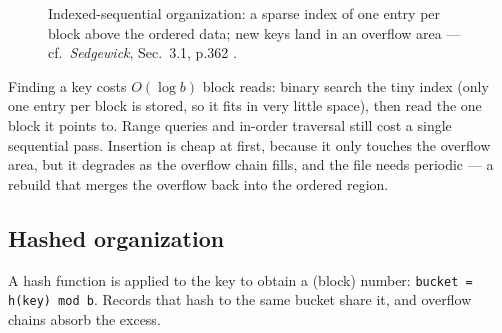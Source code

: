 \documentclass[11pt]{article}
\begin{document}
\begin{figure}[h]
  \centering
  \caption{Indexed-sequential organization: a sparse index of one entry per block above the ordered data; new keys land in an overflow area --- cf.\ \textit{Sedgewick}, Sec.~3.1, p.362 \cite{Sedgewick2011_algorithms}.}
\end{figure}

Finding a key costs $O(\log b)$ block reads: binary search the tiny index (only one entry per block is stored, so it fits in very little space), then read the one block it points to. Range queries and in-order traversal still cost a single sequential pass. Insertion is cheap at first, because it only touches the overflow area, but it degrades as the overflow chain fills, and the file needs periodic  --- a rebuild that merges the overflow back into the ordered region.

\subsection{Hashed organization}

A hash function is applied to the key to obtain a  (block) number: \texttt{bucket = h(key) mod b}. Records that hash to the same bucket share it, and overflow chains absorb the excess.
\end{document}
